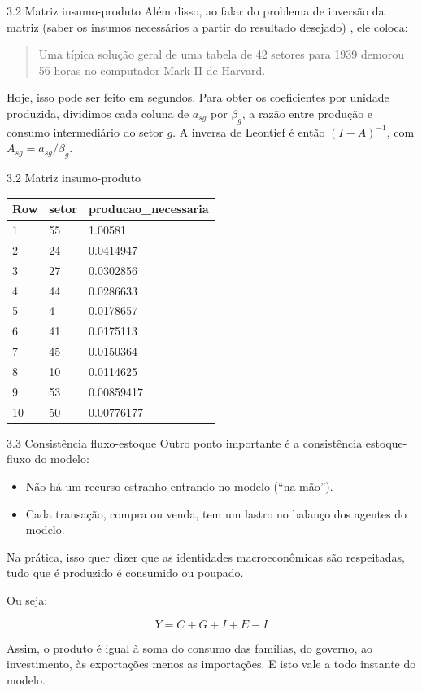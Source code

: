 \documentclass[aspectratio=169,11pt]{beamer}
\begin{document}
\begin{frame}[allowframebreaks]{3.2 Matriz insumo-produto}
\normalsize
Além disso, ao falar do problema de inversão da matriz (saber os insumos necessários a partir do resultado desejado) , ele coloca:

\begin{quote}
Uma típica solução geral de uma tabela de 42 setores para 1939 demorou 56 horas no computador Mark II de Harvard.
\end{quote}

Hoje, isso pode ser feito em segundos. Para obter os coeficientes por unidade produzida, dividimos cada coluna de \(a_{sg}\) por \(\beta_g\), a razão entre produção e consumo intermediário do setor \(g\). A inversa de Leontief é então \((I-A)^{-1}\), com \(A_{sg}=a_{sg}/\beta_g\).
\end{frame}


\begin{frame}{3.2 Matriz insumo-produto}
\small
\begin{tabularx}{\textwidth}{lXX}
Row & setor & producao\_necessaria \\
\hline
1 & 55 & 1.00581 \\
2 & 24 & 0.0414947 \\
3 & 27 & 0.0302856 \\
4 & 44 & 0.0286633 \\
5 & 4 & 0.0178657 \\
6 & 41 & 0.0175113 \\
7 & 45 & 0.0150364 \\
8 & 10 & 0.0114625 \\
9 & 53 & 0.00859417 \\
10 & 50 & 0.00776177 \\
\end{tabularx}
\end{frame}


\begin{frame}[allowframebreaks]{3.3 Consistência fluxo-estoque}
\normalsize
Outro ponto importante é a consistência estoque-fluxo do modelo:

\begin{itemize}
\item
  Não há um recurso estranho entrando no modelo (``na mão'').
\item
  Cada transação, compra ou venda, tem um lastro no balanço dos agentes do modelo.
\end{itemize}

Na prática, isso quer dizer que as identidades macroeconômicas são respeitadas, tudo que é produzido é consumido ou poupado.

Ou seja:

\[ Y = C + G + I + E - I \]

Assim, o produto é igual à soma do consumo das famílias, do governo, ao investimento, às exportações menos as importações. E isto vale a todo instante do modelo.
\end{frame}
\end{document}
